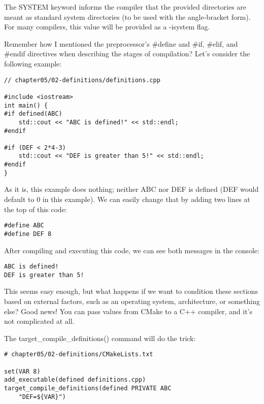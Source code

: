 The SYSTEM keyword informs the compiler that the provided directories are meant as standard system directories (to be used with the angle-bracket form). For many compilers, this value will be provided as a -isystem flag.


Remember how I mentioned the preprocessor's \#define and \#if, \#elif, and \#endif directives when describing the stages of compilation? Let's consider the following example:

\begin{lstlisting}[style=styleCXX]
// chapter05/02-definitions/definitions.cpp

#include <iostream>
int main() {
#if defined(ABC)
	std::cout << "ABC is defined!" << std::endl;
#endif

#if (DEF < 2*4-3)
	std::cout << "DEF is greater than 5!" << std::endl;
#endif
}
\end{lstlisting}

As it is, this example does nothing; neither ABC nor DEF is defined (DEF would default to 0 in this example). We can easily change that by adding two lines at the top of this code:

\begin{lstlisting}[style=styleCXX]
#define ABC
#define DEF 8
\end{lstlisting}

After compiling and executing this code, we can see both messages in the console:

\begin{lstlisting}[style=styleCXX]
ABC is defined!
DEF is greater than 5!
\end{lstlisting}

This seems easy enough, but what happens if we want to condition these sections based on external factors, such as an operating system, architecture, or something else? Good news! You can pass values from CMake to a C++ compiler, and it's not complicated at all.

The target\_compile\_definitions() command will do the trick:

\begin{lstlisting}[style=styleCMake]
# chapter05/02-definitions/CMakeLists.txt

set(VAR 8)
add_executable(defined definitions.cpp)
target_compile_definitions(defined PRIVATE ABC
	"DEF=${VAR}")
\end{lstlisting}


